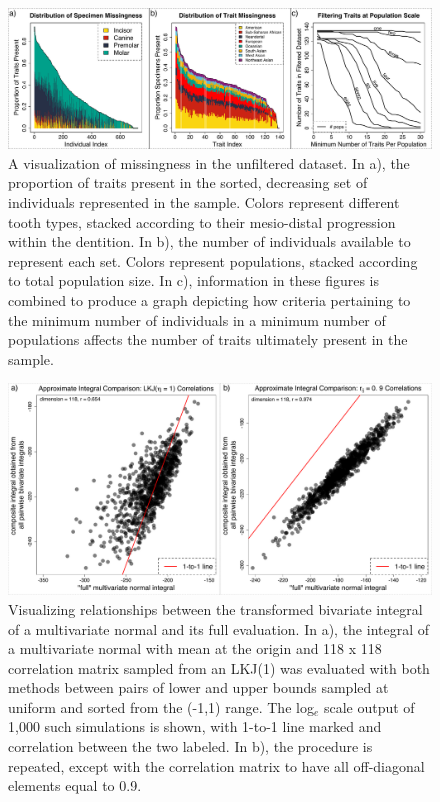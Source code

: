 \documentclass[10pt, twocolumn, twoside]{article}
\begin{document}
\begin{figure}[h]
\centering
\includegraphics[width=160mm]{figures/bailey_figure1.pdf}
\caption[Discrete Dental Missingness Visualization]{A visualization of missingness in the unfiltered dataset. In a), the proportion of traits present in the sorted, decreasing set of individuals represented in the sample. Colors represent different tooth types, stacked according to their mesio-distal progression within the dentition. In b), the number of individuals available to represent each set. Colors represent populations, stacked according to total population size. In c), information in these figures is combined to produce a graph depicting how criteria pertaining to the minimum number of individuals in a minimum number of populations affects the number of traits ultimately present in the sample. \label{overflow}
\label{fig:missingnessDENTAL}}
\end{figure}

\begin{figure}[h]
\centering
\includegraphics[width=160mm]{figures/chpt4_figure2.pdf}
\caption[Approximation of Multivariate Normal Integral by Bivariate Normal Integrals]{Visualizing relationships between the transformed bivariate integral of a multivariate normal and its full evaluation. In a), the integral of a multivariate normal with mean at the origin and 118 x 118 correlation matrix sampled from an LKJ(1) was evaluated with both methods between pairs of lower and upper bounds sampled at uniform and sorted from the (-1,1) range. The log$_e$ scale output of 1,000 such simulations is shown, with 1-to-1 line marked and correlation between the two labeled. In b), the procedure is repeated, except with the correlation matrix to have all off-diagonal elements equal to 0.9.  
\label{fig:bivVSmultivDENTAL}
\label{overflow}}
\end{figure}
\end{document}
